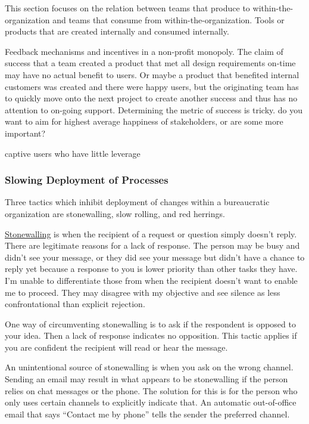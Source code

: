 This section focuses on the relation between teams that produce to within-the-organization and teams that consume from within-the-organization. Tools or products that are created internally and consumed internally.

Feedback mechanisms and incentives in a non-profit monopoly. The claim of success that a team created a product that met all design requirements on-time may have no actual benefit to users. Or maybe a product that benefited internal customers was created and there were happy users, but the originating team has to quickly move onto the next project to create another success and thus has no attention to on-going support. Determining the metric of success is tricky. do you want to aim for highest average happiness of stakeholders, or are some more important?

captive users who have little leverage 


\subsubsection{Slowing Deployment of Processes\label{sec:slow_deployment}}

Three tactics which inhibit deployment of changes within a bureaucratic organization are stonewalling, slow rolling, and red herrings. 

\underline{Stonewalling} is when the recipient of a request or question simply doesn't reply. There are legitimate reasons for a lack of response. The person may be busy and didn't see your message, or they did see your message but didn't have a chance to reply yet because a response to you is lower priority than other tasks they have. I'm unable to differentiate those from when the recipient doesn't want to enable me to proceed. They may disagree with my objective and see silence as less confrontational than explicit rejection. 

One way of circumventing stonewalling is to ask if the respondent is opposed to your idea. Then a lack of response indicates no opposition. This tactic applies if you are confident the recipient will read or hear the message.

An unintentional source of stonewalling is when you ask on the wrong channel. Sending an email may result in what appears to be stonewalling if the person relies on chat messages or the phone. The solution for this  is for the person who only uses certain channels to explicitly indicate that. An automatic out-of-office email that says ``Contact me by phone'' tells the sender the preferred channel.

